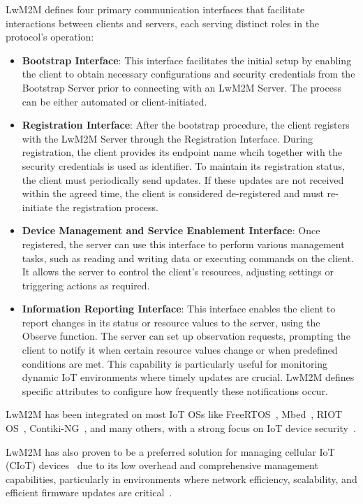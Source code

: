 \documentclass[11pt,sigconf]{iabart}
\begin{document}
LwM2M defines four primary communication interfaces that facilitate interactions between clients and servers, each serving distinct roles in the protocol's operation:

\begin{itemize}
  \item \textbf{Bootstrap Interface}: This interface facilitates the initial setup by enabling the client to obtain necessary configurations and security credentials from the Bootstrap Server prior to connecting with an LwM2M Server. The process can be either automated or client-initiated.
  
  \item \textbf{Registration Interface}: After the bootstrap procedure, the client registers with the LwM2M Server through the Registration Interface. During registration, the client provides its endpoint name whcih together with the security credentials is used as identifier. To maintain its registration status, the client must periodically send updates. If these updates are not received within the agreed time, the client is considered de-registered and must re-initiate the registration process.
  
  \item \textbf{Device Management and Service Enablement Interface}: Once registered, the server can use this interface to perform various management tasks, such as reading and writing data or executing commands on the client. It allows the server to control the client's resources, adjusting settings or triggering actions as required.
  
  \item \textbf{Information Reporting Interface}: This interface enables the client to report changes in its status or resource values to the server, using the Observe function. The server can set up observation requests, prompting the client to notify it when certain resource values change or when predefined conditions are met. This capability is particularly useful for monitoring dynamic IoT environments where timely updates are crucial. LwM2M defines specific attributes to configure how frequently these notifications occur.
\end{itemize}

LwM2M has been integrated on most IoT OSs like FreeRTOS~\cite{freertos}, Mbed~\cite{mbed}, RIOT OS~\cite{riot_os}, Contiki-NG~\cite{contiki_ng}, and many others, with a strong focus on IoT device security~\cite{pop00010}.

LwM2M has also proven to be a preferred solution for managing cellular IoT (CIoT) devices~\cite{10333286} due to its low overhead and comprehensive management capabilities, particularly in environments where network efficiency, scalability, and efficient firmware updates are critical~\cite{8725488}.
\end{document}

